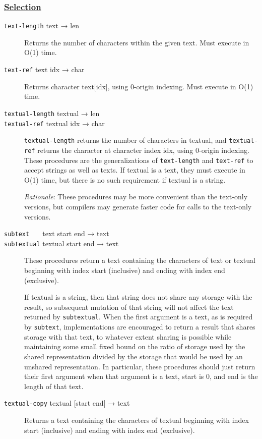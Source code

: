 \subsubsection{\texorpdfstring{\href{}{Selection}}{Selection}}\label{selection}

\begin{description}
\item[ \href{}{} \texttt{text-length} text → len ]
Returns the number of characters within the given text. Must execute in
O(1) time.
\item[ \href{}{} \texttt{text-ref} text idx → char ]
Returns character text{[}idx{]}, using 0-origin indexing. Must execute
in O(1) time.
\item[ \href{}{} \href{}{} \texttt{textual-length} textual → len\\
\texttt{textual-ref} textual idx → char ]
\texttt{textual-length} returns the number of characters in textual, and
\texttt{textual-ref} returns the character at character index idx, using
0-origin indexing. These procedures are the generalizations of
\texttt{text-length} and \texttt{text-ref} to accept strings as well as
texts. If textual is a text, they must execute in O(1) time, but there
is no such requirement if textual is a string.

\emph{Rationale}: These procedures may be more convenient than the
text-only versions, but compilers may generate faster code for calls to
the text-only versions.
\item[ \href{}{} \href{}{} \texttt{subtext~~~} text start end → text\\
\texttt{subtextual} textual start end → text ]
These procedures return a text containing the characters of text or
textual beginning with index start (inclusive) and ending with index end
(exclusive).

If textual is a string, then that string does not share any storage with
the result, so subsequent mutation of that string will not affect the
text returned by \texttt{subtextual}. When the first argument is a text,
as is required by \texttt{subtext}, implementations are encouraged to
return a result that shares storage with that text, to whatever extent
sharing is possible while maintaining some small fixed bound on the
ratio of storage used by the shared representation divided by the
storage that would be used by an unshared representation. In particular,
these procedures should just return their first argument when that
argument is a text, start is 0, and end is the length of that text.
\item[ \href{}{} \texttt{textual-copy} textual {[}start end{]} → text ]
Returns a text containing the characters of textual beginning with index
start (inclusive) and ending with index end (exclusive).


\end{description}
